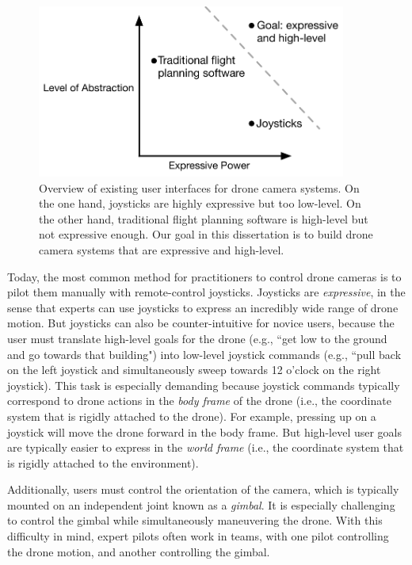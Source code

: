 \begin{figure}[th!]
\centering
\includegraphics[width=4.0in]{images/2018_introduction/intro.pdf}
\caption{
Overview of existing user interfaces for drone camera systems.
On the one hand, joysticks are highly expressive but too low-level.
On the other hand, traditional flight planning software is high-level but not expressive enough.
Our goal in this dissertation is to build drone camera systems that are expressive and high-level.
}
\label{fig:ch1:intro}
\end{figure}

Today, the most common method for practitioners to control drone cameras is to pilot them manually with remote-control joysticks.
Joysticks are \emph{expressive}, in the sense that experts can use joysticks to express an incredibly wide range of drone motion.
But joysticks can also be counter-intuitive for novice users, because the user must translate high-level goals for the drone (e.g., ``get low to the ground and go towards that building") into low-level joystick commands (e.g., ``pull back on the left joystick and simultaneously sweep towards 12 o'clock on the right joystick).
This task is especially demanding because joystick commands typically correspond to drone actions in the \emph{body frame} of the drone (i.e., the coordinate system that is rigidly attached to the drone). 
For example, pressing up on a joystick will move the drone forward in the body frame.
But high-level user goals are typically easier to express in the \emph{world frame} (i.e., the coordinate system that is rigidly attached to the environment).

Additionally, users must control the orientation of the camera, which is typically mounted on an independent joint known as a \emph{gimbal}.
It is especially challenging to control the gimbal while simultaneously maneuvering the drone.
With this difficulty in mind, expert pilots often work in teams, with one pilot controlling the drone motion, and another controlling the gimbal.

